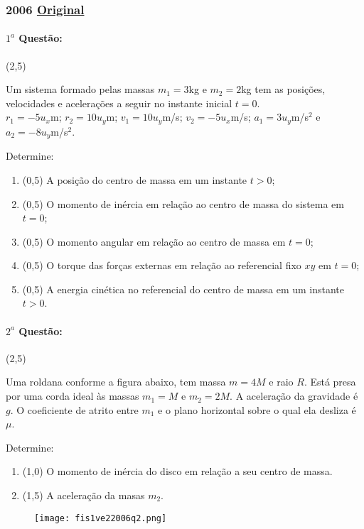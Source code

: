 \documentclass[12pt,a4paper]{article}
\newcommand{\original}[1]{\tiny \href{#1}{Original} \normalsize}
\begin{document}
\subsubsection{2006 \original{https://drive.google.com/file/d/17yHvLz6wr_5k-LVKXSLpFrtEx-3I3wvr/view?usp=sharing}}

\paragraph{$1^a$ Questão:} (2,5)

Um sistema formado pelas massas $m_1=3$kg e $m_2=2$kg tem as posições, velocidades e acelerações a seguir no instante inicial $t=0$.\\
$r_1=-5 u_x$m; $r_2=10 u_y$m; $v_1=10 u_y$m/s; $v_2=-5 u_x$m/s; $a_1=3 u_y$m/s$^2$ e $a_2=-8 u_y$m/s$^2$.

Determine:
\begin{enumerate}[label=\alph*)]
\item (0,5) A posição do centro de massa em um instante $t>0$;
\item (0,5) O momento de inércia em relação ao centro de massa do sistema em $t=0$;
\item (0,5) O momento angular em relação ao centro de massa em $t=0$;
\item (0,5) O torque das forças externas em relação ao referencial fixo $xy$ em $t=0$;
\item (0,5) A energia cinética no referencial do centro de massa em um instante $t>0$.
\end{enumerate}

\paragraph{$2^a$ Questão:} (2,5)

Uma roldana conforme a figura abaixo, tem massa $m=4M$ e raio $R$. Está presa por uma corda ideal às massas $m_1=M$ e $m_2=2M$.
A aceleração da gravidade é $g$. O coeficiente de atrito entre $m_1$ e o plano horizontal sobre o qual ela desliza é $\mu$.

Determine:

\begin{enumerate}[label=\alph*)]
\item (1,0) O momento de inércia do disco em relação a seu centro de massa.
\item (1,5) A aceleração da masas $m_2$.
\end{enumerate}

\begin{figure}[ht]
\centering
\texttt{[image: fis1ve22006q2.png]}
\end{figure}
\end{document}

